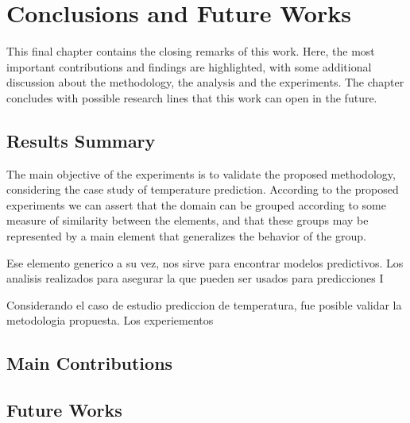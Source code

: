 \chapter{Conclusions and Future Works}\label{chapter_Conclusions}

This final chapter contains the closing remarks of this work. Here, the most important contributions and findings are highlighted, with some additional discussion about the methodology, the analysis and the experiments. The chapter concludes with possible research lines that this work can open in the future.

\section{Results Summary}

The main objective of the experiments is to validate the proposed methodology, considering the case study of temperature prediction. According to the proposed experiments we can assert that the domain can be grouped according to some measure of similarity between the elements, and that these groups may be represented by a main element that generalizes the behavior of the group. 

Ese elemento generico a su vez, nos sirve para encontrar modelos predictivos. Los analisis realizados para asegurar la  que pueden ser usados para predicciones 
I

Considerando el caso de estudio prediccion de temperatura, fue posible validar la metodologia propuesta. Los experiementos 

\section{Main Contributions}



\section{Future Works}

